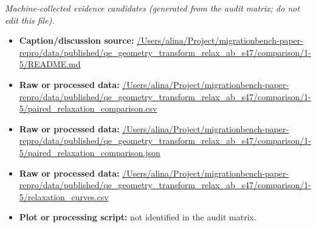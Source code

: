 \emph{Machine-collected evidence candidates (generated from the audit matrix; do not edit this file).}
\begin{itemize}[leftmargin=1.4em,noitemsep]
\item \textbf{Caption/discussion source:} \url{/Users/alina/Project/migrationbench-paper-repro/data/published/qe_geometry_transform_relax_ab_s47/comparison/1-5/README.md}
\item \textbf{Raw or processed data:} \url{/Users/alina/Project/migrationbench-paper-repro/data/published/qe_geometry_transform_relax_ab_s47/comparison/1-5/paired_relaxation_comparison.csv}
\item \textbf{Raw or processed data:} \url{/Users/alina/Project/migrationbench-paper-repro/data/published/qe_geometry_transform_relax_ab_s47/comparison/1-5/paired_relaxation_comparison.json}
\item \textbf{Raw or processed data:} \url{/Users/alina/Project/migrationbench-paper-repro/data/published/qe_geometry_transform_relax_ab_s47/comparison/1-5/relaxation_curves.csv}
\item \textbf{Plot or processing script:} not identified in the audit matrix.
\end{itemize}
